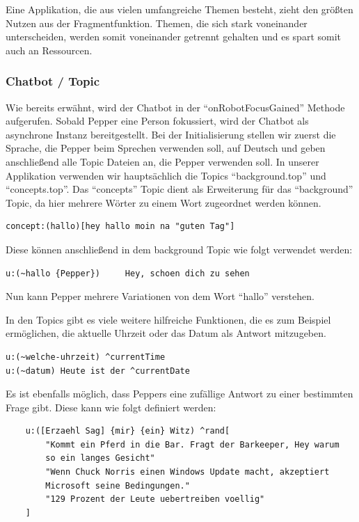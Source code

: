 Eine Applikation, die aus vielen umfangreiche Themen besteht, zieht den größten Nutzen aus der Fragmentfunktion. Themen, die sich stark voneinander 
unterscheiden, werden somit voneinander getrennt gehalten und es spart somit auch an Ressourcen.

\subsubsection{Chatbot / Topic} 

Wie bereits erwähnt, wird der Chatbot in der ``onRobotFocusGained'' Methode aufgerufen. Sobald Pepper eine Person fokussiert, wird der 
Chatbot als asynchrone Instanz bereitgestellt. Bei der Initialisierung stellen wir zuerst die Sprache, die Pepper beim Sprechen verwenden soll, 
auf Deutsch und geben anschließend alle Topic Dateien an, die Pepper verwenden soll. In unserer Applikation verwenden wir hauptsächlich die Topics 
``background.top'' und ``concepts.top''. Das ``concepts'' Topic dient als Erweiterung für das ``background'' 
Topic, da hier mehrere Wörter zu einem Wort zugeordnet werden können.
\begin{lstlisting}
concept:(hallo)[hey hallo moin na "guten Tag"]
\end{lstlisting}
Diese können anschließend in dem background Topic wie folgt verwendet werden:
\begin{lstlisting}
u:(~hallo {Pepper}) 	Hey, schoen dich zu sehen
\end{lstlisting}
Nun kann Pepper mehrere Variationen von dem Wort ``hallo'' verstehen.

In den Topics gibt es viele weitere hilfreiche Funktionen, die es zum Beispiel ermöglichen, die aktuelle Uhrzeit oder das Datum als Antwort 
mitzugeben. 

\begin{lstlisting}
u:(~welche-uhrzeit) ^currentTime
u:(~datum) Heute ist der ^currentDate
\end{lstlisting}

Es ist ebenfalls möglich, dass Peppers eine zufällige Antwort zu einer bestimmten Frage gibt. Diese kann wie folgt definiert werden:

\begin{lstlisting}
    u:([Erzaehl Sag] {mir} {ein} Witz) ^rand[
        "Kommt ein Pferd in die Bar. Fragt der Barkeeper, Hey warum 
        so ein langes Gesicht"
        "Wenn Chuck Norris einen Windows Update macht, akzeptiert 
        Microsoft seine Bedingungen."
        "129 Prozent der Leute uebertreiben voellig"
    ]
\end{lstlisting}

